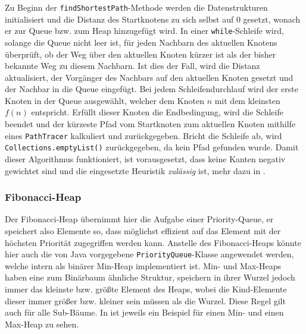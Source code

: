             

            Zu Beginn der \lstinline{findShortestPath}-Methode werden die Datenstrukturen initialisiert und die Distanz des Startknotens zu sich selbst auf $0$ gesetzt, wonach er zur Queue bzw. zum Heap hinzugefügt wird. In einer \lstinline{while}-Schleife wird, solange die Queue nicht leer ist, für jeden Nachbarn des aktuellen Knotens überprüft, ob der Weg über den aktuellen Knoten kürzer ist als der bisher bekannte Weg zu diesem Nachbarn. Ist dies der Fall, wird die Distanz aktualisiert, der Vorgänger des Nachbars auf den aktuellen Knoten gesetzt und der Nachbar in die Queue eingefügt. Bei jedem Schleifendurchlauf wird der erste Knoten in der Queue ausgewählt, welcher dem Knoten $n$ mit dem kleinsten $f(n)$ entspricht. Erfüllt dieser Knoten die Endbedingung, wird die Schleife beendet und der kürzeste Pfad vom Startknoten zum aktuellen Knoten mithilfe eines \lstinline{PathTracer} kalkuliert und zurückgegeben. Bricht die Schleife ab, wird \lstinline{Collections.emptyList()} zurückgegeben, da kein Pfad gefunden wurde. Damit dieser Algorithmus funktioniert, ist vorausgesetzt, dass keine Kanten negativ gewichtet sind und die eingesetzte Heuristik \emph{zulässig} ist, mehr dazu in .
            
            \subsubsection{Fibonacci-Heap}
            
                Der Fibonacci-Heap übernimmt hier die Aufgabe einer Priority-Queue, er speichert also Elemente so, dass möglichst effizient auf das Element mit der höchsten Priorität zugegriffen werden kann. Anstelle des Fibonacci-Heaps könnte hier auch die von Java vorgegebene \lstinline{PriorityQueue}-Klasse angewendet werden, welche intern als binärer Min-Heap implementiert ist. Min- und Max-Heaps haben eine zum Binärbaum ähnliche Struktur, speichern in ihrer Wurzel jedoch immer das kleinste bzw. größte Element des Heaps, wobei die Kind-Elemente dieser immer größer bzw. kleiner sein müssen als die Wurzel. Diese Regel gilt auch für alle Sub-Bäume. In  ist jeweils ein Beispiel für einen Min- und einen Max-Heap zu sehen.

